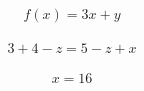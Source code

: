 \documentclass[]{report}
\begin{document}
$$f\left( x \right) = 3 x + y$$\\$$3 + 4 - z = 5 - z + x$$\\$$x = 16$$\\
\end{document}
